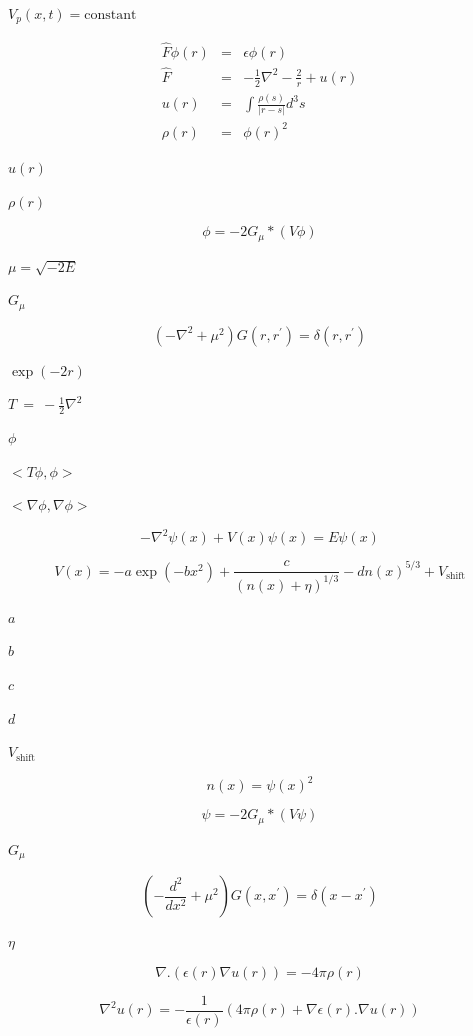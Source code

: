 \documentclass{article}
\begin{document}
$ V_p(x,t)=\mbox{constant} $
\pagebreak

\begin{eqnarray*}
   \hat{F} \phi(r) &=& \epsilon \phi(r) \\
   \hat{F} &=& -\frac{1}{2} \nabla^2 - \frac{2}{r} + u(r) \\
   u(r) &=& \int \frac{\rho(s)}{| r - s |} d^3s \\
   \rho(r) &=& \phi(r)^2
\end{eqnarray*}
\pagebreak

$ u(r) $
\pagebreak

$ \rho(r) $
\pagebreak

\[
    \phi = - 2 G_{\mu} * ( V \phi)
\]
\pagebreak

$ \mu = \sqrt{-2E} $
\pagebreak

$G_{\mu}$
\pagebreak

\[
    \left( - \nabla^2 + \mu^2  \right) G(r,r^{\prime}) = \delta(r,r^{\prime})
\]
\pagebreak

$ \exp(-2r) $
\pagebreak

$T~=~-\frac{1}{2}
\nabla^2 $
\pagebreak

$ \phi $
\pagebreak

$ <T \phi, \phi >
$
\pagebreak

$ < \nabla \phi, \nabla \phi >
$
\pagebreak

\[
-\nabla^2 \psi(x) + V(x) \psi(x) = E \psi(x)
\]
\pagebreak

\[
V(x) = -a \exp(-b x^2) + \frac{c}{(n(x)+\eta)^{1/3}} - d n(x)^{5/3} + V_{\mbox{shift}}
\]
\pagebreak

$ a $
\pagebreak

$ b $
\pagebreak

$ c $
\pagebreak

$ d $
\pagebreak

$ V_{\mbox{shift}} $
\pagebreak

\[
n(x) = \psi(x)^2
\]
\pagebreak

\[
   \psi = - 2 G_{\mu} * \left ( V \psi \right)
\]
\pagebreak

$ G_{\mu}$
\pagebreak

\[
   \left( - \frac{d^2}{dx^2} + \mu^2 \right) G(x,x^{\prime}) = \delta(x-x^{\prime})
\]
\pagebreak

$ \eta $
\pagebreak

\[
\nabla . \left( \epsilon(r) \nabla u(r)  \right) = - 4 \pi \rho(r)
\]
\pagebreak

\[
   \nabla^2 u(r) = - \frac{1}{\epsilon(r)} \left( 4 \pi \rho(r) + \nabla \epsilon(r) .  \nabla u(r) \right)
\]
\pagebreak
\end{document}
